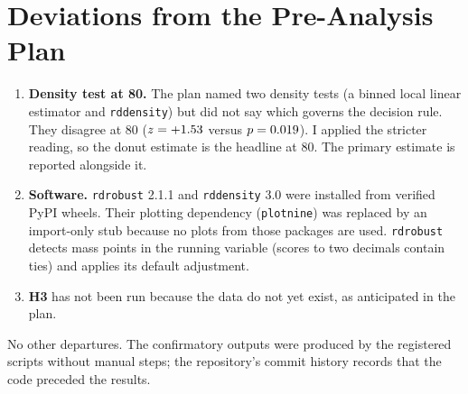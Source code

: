 \documentclass[11pt,letterpaper]{article}
\begin{document}
\section*{Deviations from the Pre-Analysis Plan}
\begin{enumerate}
\item \textbf{Density test at 80.} The plan named two density tests (a binned local linear estimator and \texttt{rddensity}) but did not say which governs the decision rule. They disagree at 80 ($z=+1.53$ versus $p=0.019$). I applied the stricter reading, so the donut estimate is the headline at 80. The primary estimate is reported alongside it.
\item \textbf{Software.} \texttt{rdrobust} 2.1.1 and \texttt{rddensity} 3.0 were installed from verified PyPI wheels. Their plotting dependency (\texttt{plotnine}) was replaced by an import-only stub because no plots from those packages are used. \texttt{rdrobust} detects mass points in the running variable (scores to two decimals contain ties) and applies its default adjustment.
\item \textbf{H3} has not been run because the data do not yet exist, as anticipated in the plan.
\end{enumerate}
No other departures. The confirmatory outputs were produced by the registered scripts without manual steps; the repository's commit history records that the code preceded the results.
\end{document}
